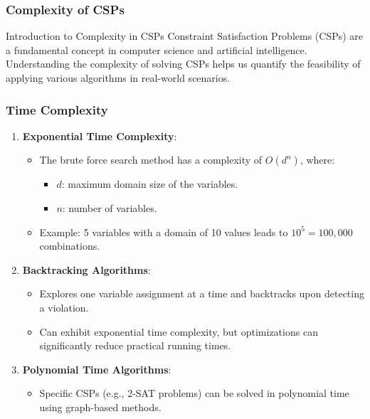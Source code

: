 \documentclass[aspectratio=169]{beamer}
\begin{document}
\begin{frame}[fragile]
    \frametitle{Complexity of CSPs}
    \begin{block}{Introduction to Complexity in CSPs}
        Constraint Satisfaction Problems (CSPs) are a fundamental concept in computer science and artificial intelligence. Understanding the complexity of solving CSPs helps us quantify the feasibility of applying various algorithms in real-world scenarios.
    \end{block}
\end{frame}

\begin{frame}[fragile]
    \frametitle{Time Complexity}
    \begin{enumerate}
        \item \textbf{Exponential Time Complexity}:
        \begin{itemize}
            \item The brute force search method has a complexity of $O(d^n)$, where:
            \begin{itemize}
                \item $d$: maximum domain size of the variables.
                \item $n$: number of variables.
            \end{itemize}
            \item Example: 5 variables with a domain of 10 values leads to $10^5 = 100,000$ combinations.
        \end{itemize}
        
        \item \textbf{Backtracking Algorithms}:
        \begin{itemize}
            \item Explores one variable assignment at a time and backtracks upon detecting a violation.
            \item Can exhibit exponential time complexity, but optimizations can significantly reduce practical running times.
        \end{itemize}

        \item \textbf{Polynomial Time Algorithms}:
        \begin{itemize}
            \item Specific CSPs (e.g., 2-SAT problems) can be solved in polynomial time using graph-based methods.
        \end{itemize}
    \end{enumerate}
\end{frame}
\end{document}
